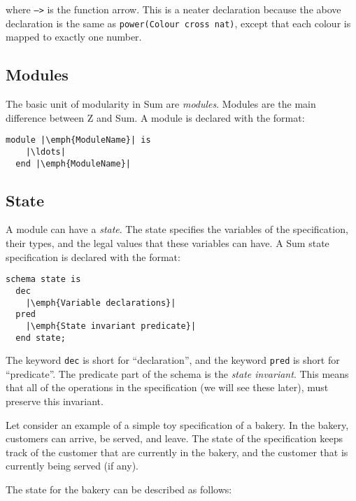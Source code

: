 where \texttt{-->} is the function arrow. This is a neater declaration because the above declaration is the same as \texttt{power(Colour cross nat)}, except that each colour is mapped to exactly one number.

\subsection{Modules}

The basic unit of modularity in Sum are \emph{modules}. Modules are the main difference between Z and Sum. A module is declared with the format:

\lstset{language=}
\lstset{aboveskip=3mm}
\begin{lstlisting}[escapeinside={||}]
  module |\emph{ModuleName}| is
    |\ldots|
  end |\emph{ModuleName}|
\end{lstlisting}

\subsection{State}

A module can have a \emph{state}. The state specifies the variables of the specification, their types, and the legal values that these variables can have. A Sum state specification is declared with the format:

\lstset{aboveskip=3mm}
\begin{lstlisting}[escapeinside={||}]
  schema state is
  dec
    |\emph{Variable declarations}|
  pred
    |\emph{State invariant predicate}|
  end state;
\end{lstlisting}

The keyword \texttt{dec} is short for ``declaration'', and the keyword \texttt{pred} is short for ``predicate''. The predicate part of the schema is the \emph{state invariant}. This means that all of the operations in the specification (we will see these later), must preserve this invariant.

\begin{example}
 Let consider an example of a simple toy specification of a bakery. In the bakery, customers can arrive, be served, and leave. The state of the specification keeps track of the customer that are currently in the bakery, and the customer that is currently being served (if any).

The state for the bakery can be described as follows:



\end{example}

